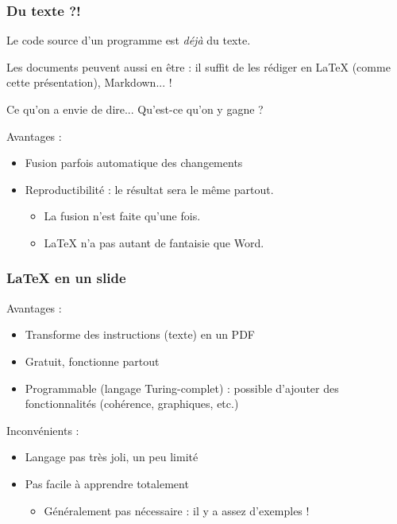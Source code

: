 \documentclass[compress]{beamer}
\newenvironment{envie}
	{\begin{block}{Ce qu'on a envie de dire...}}
	{\end{block}}
\begin{document}
\begin{frame}
	\frametitle{Du texte ?!}
	Le code source d'un programme est \emph{déjà} du texte.
	\pause

	Les documents peuvent aussi en être : il suffit de les rédiger en
	\LaTeX{} (comme cette présentation), Markdown... !
	\pause

	\begin{envie}
		Qu'est-ce qu'on y gagne ? \pause
	\end{envie}

	Avantages :
	\begin{itemize}
		\item Fusion parfois automatique des changements \pause
		\item Reproductibilité : le résultat sera le même partout. \pause
			\begin{itemize}
				\item La fusion n'est faite qu'une fois. \pause
				\item \LaTeX{} n'a pas autant de fantaisie que Word.
			\end{itemize}
	\end{itemize}
\end{frame}

\begin{frame}
	\frametitle{\LaTeX{} en un slide}
	Avantages :
	\begin{itemize}
		\item Transforme des instructions (texte) en un PDF
		\item Gratuit, fonctionne partout
		\item Programmable (langage Turing-complet) :
			possible d'ajouter des fonctionnalités
			(cohérence, graphiques, etc.)
	\end{itemize}
	Inconvénients :
	\begin{itemize}
		\item Langage pas très joli, un peu limité
		\item Pas facile à apprendre totalement
			\begin{itemize}
				\item Généralement pas nécessaire : il y a assez d'exemples !
			\end{itemize}
	\end{itemize}
\end{frame}
\end{document}
